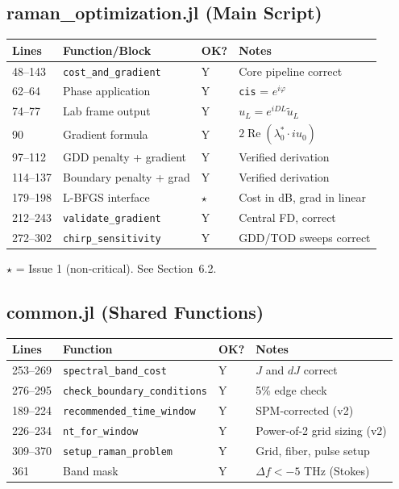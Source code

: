\documentclass[12pt,a4paper]{article}
\newcommand{\Real}{\operatorname{Re}}
\theoremstyle{definition}
\begin{document}
\subsection{raman\_optimization.jl (Main Script)}

\begin{center}
\begin{tabular}{p{1.5cm}p{5cm}p{1cm}p{3cm}}
\toprule
\textbf{Lines} & \textbf{Function/Block} & \textbf{OK?} & \textbf{Notes} \\
\midrule
48--143 & \texttt{cost\_and\_gradient} & Y & Core pipeline correct \\
62--64 & Phase application & Y & \texttt{cis} = $e^{i\varphi}$ \\
74--77 & Lab frame output & Y & $u_L = e^{iDL}\tilde u_L$ \\
90 & Gradient formula & Y & $2\Real(\lambda_0^* \cdot iu_0)$ \\
97--112 & GDD penalty + gradient & Y & Verified derivation \\
114--137 & Boundary penalty + grad & Y & Verified derivation \\
179--198 & L-BFGS interface & $\star$ & Cost in dB, grad in linear \\
212--243 & \texttt{validate\_gradient} & Y & Central FD, correct \\
272--302 & \texttt{chirp\_sensitivity} & Y & GDD/TOD sweeps correct \\
\bottomrule
\end{tabular}
\end{center}

$\star$ = Issue 1 (non-critical). See Section~6.2.

\subsection{common.jl (Shared Functions)}

\begin{center}
\begin{tabular}{p{1.5cm}p{5cm}p{1cm}p{3cm}}
\toprule
\textbf{Lines} & \textbf{Function} & \textbf{OK?} & \textbf{Notes} \\
\midrule
253--269 & \texttt{spectral\_band\_cost} & Y & $J$ and $dJ$ correct \\
276--295 & \texttt{check\_boundary\_conditions} & Y & 5\% edge check \\
189--224 & \texttt{recommended\_time\_window} & Y & SPM-corrected (v2) \\
226--234 & \texttt{nt\_for\_window} & Y & Power-of-2 grid sizing (v2) \\
309--370 & \texttt{setup\_raman\_problem} & Y & Grid, fiber, pulse setup \\
361 & Band mask & Y & $\Delta f < -5$ THz (Stokes) \\
\bottomrule
\end{tabular}
\end{center}
\end{document}
